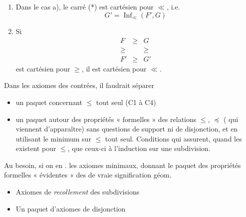 \documentclass[11pt,a4paper]{article}
\begin{document}
\begin{enumerate}
  \item[(ii)] Dans le cas a), le carré (*)  est cartésien pour $\ll$, i.e.
  \[
    G' = \operatorname{Inf}_{\ll}(F', G)
  \]
  \item[(iii)]  Si 
  \[
    \begin{array}{ccc}
      F & \geq & G \\
      \geq & & \geq \\
      F' & \geq & G'
    \end{array}
  \]
  est cartésien pour $\geq$, il est cartésien pour \struck{\ill{}} $\ll$.
\end{enumerate}


Dans les axiomes des contrées, il faudrait séparer
\begin{itemize}
  \item[$\circledast$] un paquet concernant $\leq$ tout seul (C1 à C4)
  \item[$\circledast$] un paquet autour des propriétés « formelles » des relations $\leq$, $\preccurlyeq$ ( qui viennent d'apparaître) sans questions de support ni de disjonction, et en utilisant le minimum sur $\leq$ tout seul. Conditions qui assurent, quand les   existent pour $\leq$, que ceux-ci  à l'induction sur une subdivision.
\end{itemize}

Au besoin, si on en \ill{} \ill{}.  \ill{} \ill{} \ill{} \ill{} les axiomes minimaux, donnant le paquet des propriétés formelles « évidentes » des \ill{} de vraie signification géom.

\begin{itemize}
  \item[$\circledast$] Axiomes de \emph{recollement} des \struck{\ill{}} subdivisions
  \item[$\circledast$]  Un paquet d'axiomes de disjonction
\end{itemize}
\end{document}
